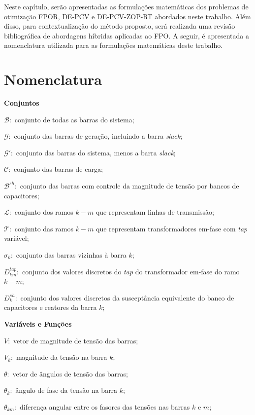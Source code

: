 \documentclass[
	12pt,				%
	openany,			%
	twoside,			%
	a4paper,			%
	chapter=TITLE,		%
	section=Title,		%
	subsection=Title,	%
	subsubsection=Title,%
	english,			%
	french,				%
	spanish,			%
	brazil			%
	]{abntex2}
\begin{document}
\begin{ERRATA}
Neste capítulo, serão apresentadas as formulações matemáticas dos problemas de otimização FPOR, DE-PCV e DE-PCV-ZOP-RT abordados neste trabalho. Além disso, para contextualização do método proposto, será realizada uma revisão bibliográfica de abordagens híbridas aplicadas ao FPO. A seguir, é apresentada a nomenclatura utilizada para as formulações matemáticas deste trabalho.

\section{Nomenclatura}

\noindent \textbf{Conjuntos}

\noindent $\mathcal{B}:$ conjunto de todas as barras do sistema;

\noindent $\mathcal{G}:$ conjunto das barras de geração, incluindo a barra \emph{slack};

\noindent $\mathcal{G}':$ conjunto das barras do sistema, menos a barra \emph{slack};

\noindent $\mathcal{C}:$ conjunto das barras de carga; 

\noindent $\mathcal{B}^{sh}:$ conjunto das barras com controle da magnitude de tensão por bancos de capacitores;

\noindent $\mathcal{L}:$ conjunto dos ramos $k-m$ que representam linhas de transmissão;

\noindent $\mathcal{T}:$ conjunto das ramos $k-m$ que representam transformadores em-fase com \textit{tap} variável;  

\noindent $\mathcal{\sigma}_k:$ conjunto das barras vizinhas à barra $k$;

\noindent $D_{km}^{tap}:$ conjunto dos valores discretos do \textit{tap} do transformador em-fase do ramo $k-m$;

\noindent $D_{k}^{sh}:$ conjunto dos valores discretos da susceptância equivalente do banco de capacitores e reatores da barra $k$;

\noindent \textbf{Variáveis e Funções}

\noindent $V:$ vetor de magnitude de tensão das barras;

\noindent $V_k:$ magnitude da tensão na barra $k$;

\noindent $\theta:$ vetor de ângulos de tensão das barras;

\noindent $\theta_k:$ ângulo de fase da tensão na barra $k$;

\noindent $\theta_{km}:$ diferença angular entre os fasores das tensões nas barras $k$ e $m$;


\end{ERRATA}
\end{document}
